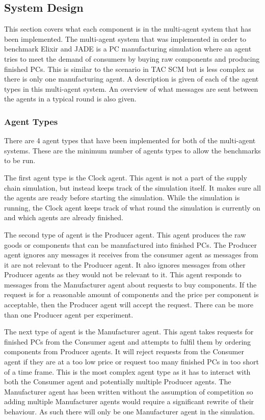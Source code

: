 \subsection{System Design}

This section covers what each component is in the multi-agent system that has been implemented.
The multi-agent system that was implemented in order to benchmark Elixir and JADE is a PC manufacturing simulation where an agent tries to meet the demand of consumers by buying raw components and producing finished PCs.
This is similar to the scenario in TAC SCM but is less complex as there is only one manufacturing agent.
A description is given of each of the agent types in this multi-agent system.
An overview of what messages are sent between the agents in a typical round is also given.

\subsubsection{Agent Types}

There are 4 agent types that have been implemented for both of the multi-agent systems.
These are the minimum number of agents types to allow the benchmarks to be run.

The first agent type is the Clock agent.
This agent is not a part of the supply chain simulation, but instead keeps track of the simulation itself.
It makes sure all the agents are ready before starting the simulation.
While the simulation is running, the Clock agent keeps track of what round the simulation is currently on and which agents are already finished.

The second type of agent is the Producer agent.
This agent produces the raw goods or components that can be manufactured into finished PCs.
The Producer agent ignores any messages it receives from the consumer agent as messages from it are not relevant to the Producer agent.
It also ignores messages from other Producer agents as they would not be relevant to it.
This agent responds to messages from the Manufacturer agent about requests to buy components.
If the request is for a reasonable amount of components and the price per component is acceptable, then the Producer agent will accept the request.
There can be more than one Producer agent per experiment.

The next type of agent is the Manufacturer agent.
This agent takes requests for finished PCs from the Consumer agent and attempts to fulfil them by ordering components from Producer agents.
It will reject requests from the Consumer agent if they are at a too low price or request too many finished PCs in too short of a time frame.
This is the most complex agent type as it has to interact with both the Consumer agent and potentially multiple Producer agents.
The Manufacturer agent has been written without the assumption of competition so adding multiple Manufacturer agents would require a significant rewrite of their behaviour.
As such there will only be one Manufacturer agent in the simulation.

